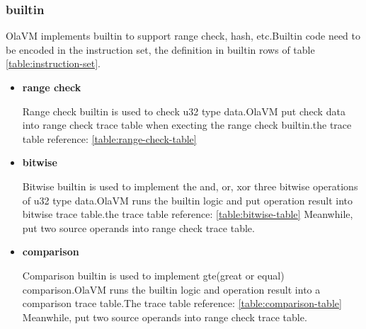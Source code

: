 \subsubsection{builtin}\label{subsec: instructions-builtin}
OlaVM implements builtin to support range check, hash, etc.Builtin code need to be encoded in the instruction set, the definition in builtin rows of table \ref{table:instruction-set}. \\

\begin{itemize}
    \item \textbf{range check}

Range check builtin is used to check u32 type data.OlaVM put check data into range check trace table when execting the range check builtin.the trace table reference: \ref{table:range-check-table}
    \item \textbf{bitwise}

Bitwise builtin is used to implement the and, or, xor three bitwise operations of u32 type data.OlaVM runs the builtin logic and put operation result into bitwise trace table.the trace table reference: \ref{table:bitwise-table}
Meanwhile, put two source operands into range check trace table.
    \item \textbf{comparison}

Comparison builtin is used to implement gte(great or equal) comparison.OlaVM runs the builtin logic and operation result into a comparison trace table.The trace table reference: \ref{table:comparison-table}
Meanwhile, put two source operands into range check trace table.
\end{itemize}